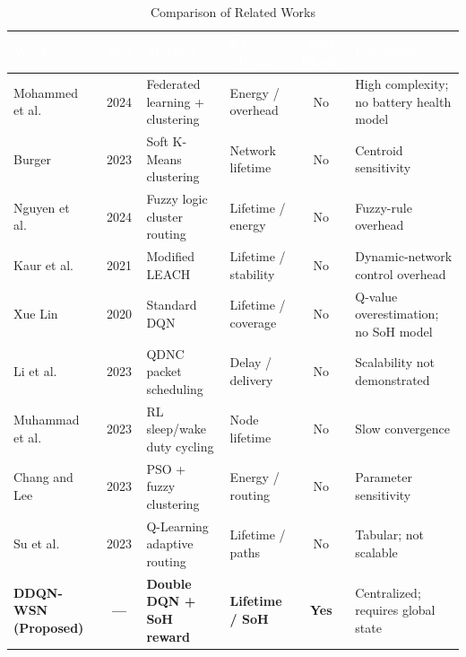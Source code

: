 \documentclass[journal]{IEEEtran}
\begin{document}
\begin{table}[!t]
\caption{Comparison of Related Works\label{tab:related}}
\centering
\renewcommand{\arraystretch}{1.25}
\small
\begin{tabular}{|p{2.5cm}|c|p{2.8cm}|p{2.2cm}|c|p{3.8cm}|}
\hline
\rowcolor{headerblue}
\textcolor{white}{\textbf{Work}} &
\textcolor{white}{\textbf{Year}} &
\textcolor{white}{\textbf{Method}} &
\textcolor{white}{\textbf{Key Metric}} &
\textcolor{white}{\textbf{SoH Model}} &
\textcolor{white}{\textbf{Limitation}} \\
\hline

Mohammed et al.~\cite{mohammed2024} & 2024 &
Federated learning + clustering &
Energy / overhead &
No &
High complexity; no battery health model \\
\hline

\rowcolor{rowgray}
Burger~\cite{burger2023} & 2023 &
Soft K-Means clustering &
Network lifetime &
No &
Centroid sensitivity \\
\hline

Nguyen et al.~\cite{nguyen2024} & 2024 &
Fuzzy logic cluster routing &
Lifetime / energy &
No &
Fuzzy-rule overhead \\
\hline

\rowcolor{rowgray}
Kaur et al.~\cite{kaur2021} & 2021 &
Modified LEACH &
Lifetime / stability &
No &
Dynamic-network control overhead \\
\hline

Xue Lin~\cite{xue2020} & 2020 &
Standard DQN &
Lifetime / coverage &
No &
Q-value overestimation; no SoH model \\
\hline

\rowcolor{rowgray}
Li et al.~\cite{li2023} & 2023 &
QDNC packet scheduling &
Delay / delivery &
No &
Scalability not demonstrated \\
\hline

Muhammad et al.~\cite{muhammad2023} & 2023 &
RL sleep/wake duty cycling &
Node lifetime &
No &
Slow convergence \\
\hline

\rowcolor{rowgray}
Chang and Lee~\cite{chang2023} & 2023 &
PSO + fuzzy clustering &
Energy / routing &
No &
Parameter sensitivity \\
\hline

Su et al.~\cite{su2023} & 2023 &
Q-Learning adaptive routing &
Lifetime / paths &
No &
Tabular; not scalable \\
\hline

\textbf{DDQN-WSN (Proposed)} & \textbf{---} &
\textbf{Double DQN + SoH reward} &
\textbf{Lifetime / SoH} &
\textbf{Yes} &
Centralized; requires global state \\
\hline

\end{tabular}
\end{table}
\end{document}
